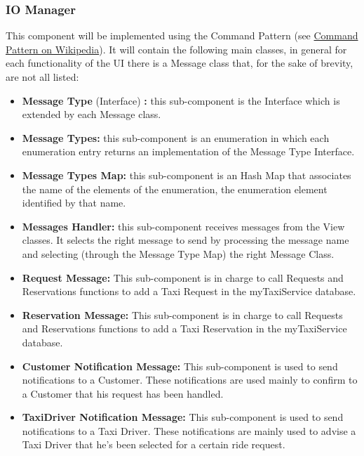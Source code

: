 \documentclass[../../../../../../../dd.tex]{subfiles}
\begin{document}
	\subsubsection{IO Manager}
		This component will be implemented using the Command Pattern (see \href{https://it.wikipedia.org/wiki/Command_pattern}{Command Pattern on Wikipedia}).
		It will contain the following main classes, in general for each functionality of the UI there is a Message class that, for the sake of brevity, are not all listed:
		\begin{itemize}
			\item \textbf{Message Type} (Interface) \textbf{:} this sub-component is the Interface which is extended by each Message class. 

			\item \textbf{Message Types:} this sub-component is an enumeration in which each enumeration entry returns an implementation of the Message Type Interface.

			\item \textbf{Message Types Map:} this sub-component is an Hash Map that associates the name of the elements of the enumeration, the enumeration element identified by that name.

			\item \textbf{Messages Handler:} this sub-component receives messages from the View classes. It selects the right message to send by processing the message name and selecting (through the Message Type Map) the right Message Class.

			\item \textbf{Request Message:} This sub-component is in charge to call Requests and Reservations functions to add a Taxi Request in the myTaxiService database.

			\item \textbf{Reservation Message:} This sub-component is in charge to call Requests and Reservations functions to add a Taxi Reservation in the myTaxiService database.

			\item \textbf{Customer Notification Message:} This sub-component is used to send notifications to a Customer. These notifications are used mainly to confirm to a Customer that his request has been handled.

			\item \textbf{TaxiDriver Notification Message:} This sub-component is used to send notifications to a Taxi Driver. These notifications are mainly used to advise a Taxi Driver that he's been selected for a certain ride request.


\end{itemize}
\end{document}
